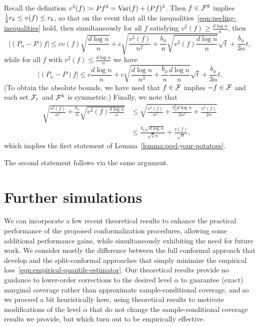 \documentclass{article}
\newcommand{\radphi}{b_{\phi}}
\begin{document}
Recall the definition $v^2(f) \coloneqq Pf^2 = {\rm Var}(f) + (Pf)^2$. Then
$f \in \mathcal{F}^k$ implies $\frac{1}{2} r_k \le v(f) \le r_k$, so that
on the event that all the inequalities~\eqref{eqn:peeling-inequalities}
hold, then simultaneously for all $f$ satisfying
$v^2(f) \ge \frac{d \log n}{n}$, then
\begin{equation*}
  \left|(P_n - P) f\right|
  \le c v(f) \sqrt{\frac{d \log n}{n}}
  + c \sqrt{\frac{v^2(f)}{n^2}
    + \frac{\radphi}{n} \sqrt{v^2(f) \frac{d \log n}{n}}}
  \sqrt{t} + \frac{\radphi}{3n} t,
\end{equation*}
while for all $f$ with $v^2(f) \le \frac{d \log n}{n}$ we have
\begin{equation*}
  |(P_n - P) f|
  \le c \frac{d \log n}{n}
  + c \sqrt{\frac{d \log n}{n^3}
    + \frac{\radphi}{n} \frac{d \log n}{n}} \sqrt{t} + \frac{\radphi}{3n} t.
\end{equation*}
(To obtain the absolute bounds, we have used that $f \in \mathcal{F}$ implies
$-f \in \mathcal{F}$ and each set $\mathcal{F}_r$ and $\mathcal{F}^k$ is symmetric.)
Finally, we note that
\begin{align*}
  \sqrt{\frac{v^2(f)}{n^2}
    + \frac{\radphi}{n}
    \sqrt{v^2(f) \frac{d \log n}{n}}}
  & \le \sqrt{\frac{v^2(f)}{n^2}
    + \frac{\radphi^2 d \log n}{2 n^2}
    + \frac{v^2(f)}{2 n}} \\
  & \le \frac{\radphi \sqrt{d \log n}}{\sqrt{2} n}
  + \frac{v(f)}{\sqrt{n}},
\end{align*}
which implies the first statement of Lemma~\ref{lemma:peel-your-potatoes}.

The second statement follows via the same argument.

\section{Further simulations}
\label{sec:further-simulations}

We can incorporate a few recent theoretical results to enhance
the practical performance of the proposed conformalization procedures,
allowing some additional performance gains, while simultaneously
exhibiting the need for future work.
%
We consider mostly the difference between the full conformal approach that
\citet{GibbsChCa25} develop and the split-conformal approaches
that simply minimize the empirical
loss~\eqref{eqn:empirical-quantile-estimator}.
%
Our theoretical results provide no guidance to lower-order corrections
to the desired level $\alpha$ to guarantee (exact) marginal coverage
rather than approximate sample-conditional coverage, and
so we proceed a bit heuristically here, using theoretical
results to motivate modifications of the level $\alpha$ that
do not change the sample-conditional coverage results we provide, but
which turn out to be empirically effective.
\end{document}
